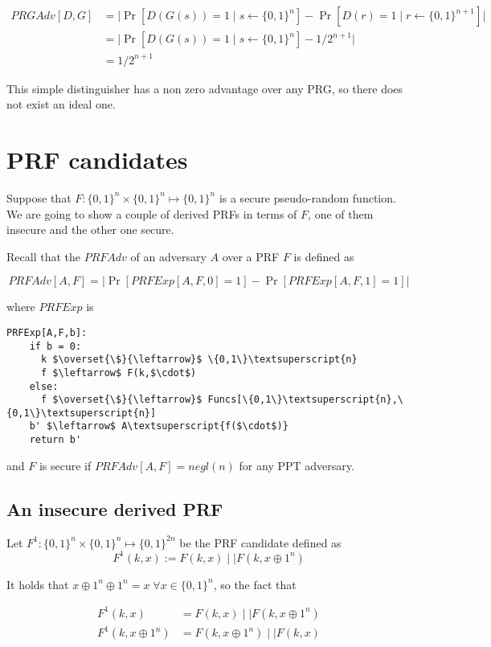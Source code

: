 \documentclass{article}
\newcommand{\bit}[1]{\{0,1\}^{#1}}
\newcommand{\zo}{\{0,1\}}
\newcommand{\xor}{\oplus}
\begin{document}
\begin{align*}
  PRGAdv[D, G] &= 
    \Big| 
      \Pr[D(G(s))=1\mid s\gets \zo^n] -
      \Pr[D(r) = 1 \mid r\gets \zo^{n+1}] 
    \Big| \\
    &= \Big| 
      \Pr[D(G(s))=1\mid s\gets \zo^n] -
      1/2^{n+1}
    \Big| \\
    &= 1/2^{n + 1}
\end{align*}

This simple distinguisher has a non zero advantage over any PRG,
so there does not exist an ideal one.

\section{PRF candidates}

Suppose that $F: \bit{n} \times \bit{n} \mapsto\bit{n}$ is a secure
pseudo-random function. We are going to show a couple of derived PRFs
in terms of $F$, one of them insecure and the other one secure.

Recall that the $PRFAdv$ of an adversary $A$ over a PRF $F$ is 
defined as

$$
  PRFAdv[A,F] = 
    \Big| 
      \Pr[PRFExp[A,F,0]=1] -
      \Pr[PRFExp[A,F,1]=1]
    \Big|
$$

where $PRFExp$ is 

\begin{Verbatim}[commandchars=\\\{\},codes={\catcode`$=3\catcode`_=8}]
  PRFExp[A,F,b]:
    if b = 0:
      k $\overset{\$}{\leftarrow}$ \{0,1\}\textsuperscript{n}
      f $\leftarrow$ F(k,$\cdot$)
    else:
      f $\overset{\$}{\leftarrow}$ Funcs[\{0,1\}\textsuperscript{n},\{0,1\}\textsuperscript{n}]
    b' $\leftarrow$ A\textsuperscript{f($\cdot$)}
    return b'
\end{Verbatim}

and $F$ is secure if $PRFAdv[A,F] = negl(n)$ for any PPT adversary.

\subsection{An insecure derived PRF }\label{prf:insec}

Let $F^1: \bit{n} \times \bit{n} \mapsto\bit{2n}$ be the PRF candidate
defined as 
$$F^1(k, x) := F(k, x) \mid\mid F(k, x \xor 1^n)$$

It holds that $x \xor 1^n \xor 1^n = x \; \forall x \in \bit{n}$, so
the fact that 

\begin{align*}
  F^1(k, x) &= F(k, x) \mid\mid F(k, x \xor 1^n) \\
  F^1(k, x \xor 1^n) &= F(k, x \xor 1^n) \mid\mid F(k, x) 
\end{align*}
\end{document}
